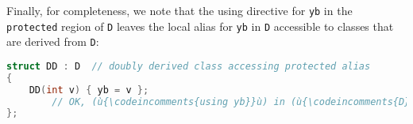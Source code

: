 \noindent Finally, for completeness, we note that the using directive for
\texttt{yb} in the \texttt{protected} region of \texttt{D} leaves the
local alias for \texttt{yb} in \texttt{D} accessible to classes that are
derived from \texttt{D}:

\begin{lstlisting}[language=C++]
struct DD : D  // doubly derived class accessing protected alias
{
    DD(int v) { yb = v };
        // OK, (ù{\codeincomments{using yb}}ù) in (ù{\codeincomments{D}}ù) exposes (ù{\codeincomments{protected}}ù) alias; assigns (17).
};
\end{lstlisting}
    


